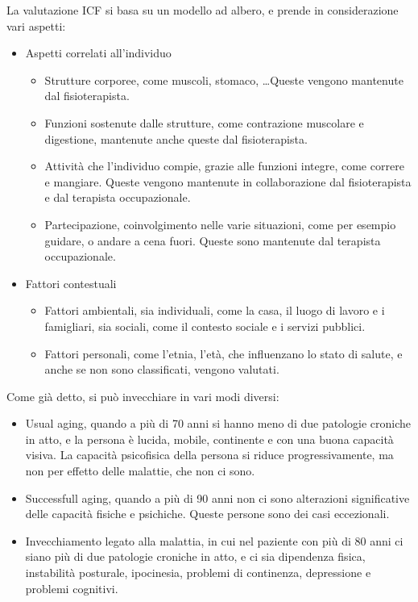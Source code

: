 La valutazione ICF si basa su un modello ad albero, e prende in considerazione
vari aspetti:
\begin{itemize}
\item Aspetti correlati all'individuo
	\begin{itemize}
	\item Strutture corporee, come muscoli, stomaco, \dots Queste vengono mantenute
	dal fisioterapista.
	\item Funzioni sostenute dalle strutture, come contrazione muscolare e
	digestione, mantenute anche queste dal fisioterapista.
	\item Attività che l'individuo compie, grazie alle funzioni integre, come
	correre e mangiare. Queste vengono mantenute in collaborazione dal
	fisioterapista e dal terapista occupazionale.
	\item Partecipazione, coinvolgimento nelle varie situazioni, come per esempio
	guidare, o andare a cena fuori. Queste sono mantenute dal terapista
	occupazionale.
	\end{itemize}
\item Fattori contestuali
	\begin{itemize}
	\item Fattori ambientali, sia individuali, come la casa, il luogo di lavoro e i
	famigliari, sia sociali, come il contesto sociale e i servizi pubblici.
	\item Fattori personali, come l'etnia, l'età, che influenzano lo stato di
	salute, e anche se non sono classificati, vengono valutati.
	\end{itemize}
\end{itemize}

Come già detto, si può invecchiare in vari modi diversi:
\begin{itemize}
\item Usual aging, quando a più di 70 anni si hanno meno di due patologie
croniche in atto, e la persona è lucida, mobile, continente e con una buona
capacità visiva. La capacità psicofisica della persona si riduce
progressivamente, ma non per effetto delle malattie, che non ci sono.
\item Successfull aging, quando a più di 90 anni non ci sono alterazioni
significative delle capacità fisiche e psichiche. Queste persone sono dei casi
eccezionali.
\item Invecchiamento legato alla malattia, in cui nel paziente con più di 80
anni ci siano più di due patologie croniche in atto, e ci sia dipendenza fisica,
instabilità posturale, ipocinesia, problemi di continenza, depressione e
problemi cognitivi.
\end{itemize}

